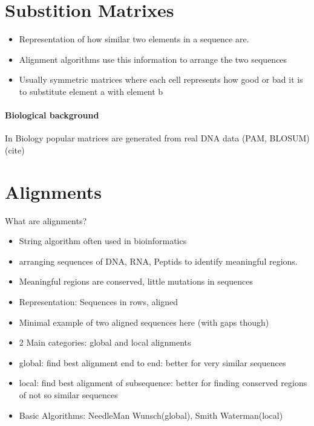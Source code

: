 \section{Substition Matrixes}
\label{sec:foundationsubstitutionmatrix}
	\begin{itemize}
		\item Representation of how similar two elements in a sequence are. 
		\item Alignment algorithms use this information to arrange the two sequences 
		\item Usually symmetric matrices where each cell represents how good or bad it is to substitute element a with element b  
	\end{itemize}
	\paragraph{Biological background}
	In Biology popular matrices are generated from real DNA data (PAM, BLOSUM) (cite)

\section{Alignments}
What are alignments? 
\begin{itemize}
	\item String algorithm often used in bioinformatics 
	\item arranging sequences of DNA, RNA, Peptids to identify meaningful regions.
	\item Meaningful regions are conserved, little mutations in sequences
	\item Representation: Sequences in rows, aligned 
	\item Minimal example of two aligned sequences here (with gaps though)
	\item 2 Main categories: global and local alignments 
	\item global: find best alignment end to end: better for very similar sequences
	\item local: find best alignment of subsequence: better for finding conserved regions of not so similar sequences
	\item Basic Algorithms: NeedleMan Wunsch(global), Smith Waterman(local) 
\end{itemize} 


